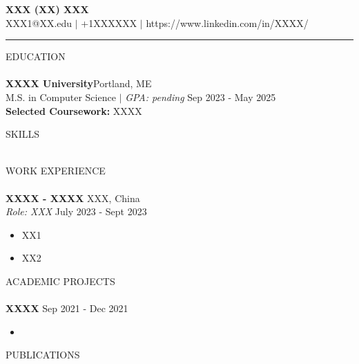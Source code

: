 \documentclass[a4paper]{article}
\newcommand{\lineunder} {
    \vspace*{-8pt} \\
    \hspace*{-5pt} \hrulefill \\
}
\newcommand{\header} [1] {
    {\hspace*{-5pt}\vspace*{6pt} \textsc{#1}}
    \vspace*{-6pt} \lineunder
}
\begin{document}
\vspace*{-40pt}

    

\vspace*{-10pt}
\begin{center}
	{\huge \scshape \textbf{XXX (XX) XXX}}\\
	 XXX1@XX.edu $\vert$ +1XXXXXX $\vert$ https://www.linkedin.com/in/XXXX/ \\
\end{center}

\vspace{-3ex}
\rule{\textwidth}{2pt} %

\vspace*{1pt}
\header{EDUCATION}
\textbf{XXXX University}\hfill Portland, ME\\
M.S. in Computer Science $\vert$ \textit{GPA: pending} \hfill Sep 2023 - May 2025\\
\textbf{Selected Coursework:} XXXX\\

\vspace{2mm}


\header{SKILLS}

\vspace{2mm}

\header{WORK EXPERIENCE}

\textbf{XXXX - XXXX} \hfill XXX, China\\
\textit{Role: XXX} \hfill July 2023 - Sept 2023
\vspace{-2mm}
\begin{itemize} \itemsep -1mm
\item XX1
\item XX2
\end{itemize}

\setlength{\parskip}{0pt} %



\vspace{-1mm}

\header{ACADEMIC PROJECTS}
\vspace{0mm}
\noindent
\textbf{XXXX} \hfill Sep 2021 - Dec 2021\\
\vspace{-2.5mm}
\begin{itemize}\itemsep -1mm
\item 
\end{itemize}



\header{PUBLICATIONS}

\vspace{2mm}

\ 
\end{document}
